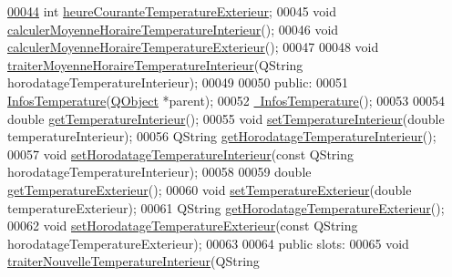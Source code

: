 \begin{DoxyCode}
\hyperlink{class_infos_temperature_a44edcf244175896e28798f252900f774}{00044}     \textcolor{keywordtype}{int} \hyperlink{class_infos_temperature_a44edcf244175896e28798f252900f774}{heureCouranteTemperatureExterieur};
00045     \textcolor{keywordtype}{void} \hyperlink{class_infos_temperature_a8cb8b9bef07506019ea6c9d91809af87}{calculerMoyenneHoraireTemperatureInterieur}();
00046     \textcolor{keywordtype}{void} \hyperlink{class_infos_temperature_a437325028225d765780b884614c47077}{calculerMoyenneHoraireTemperatureExterieur}();
00047 
00048     \textcolor{keywordtype}{void} \hyperlink{class_infos_temperature_a0311c8ce5730388f3baef752920d5abf}{traiterMoyenneHoraireTemperatureInterieur}(QString 
      horodatageTemperatureInterieur);
00049 
00050 \textcolor{keyword}{public}:
00051     \hyperlink{class_infos_temperature_ac628607fe2ff9ca9e2d6bad741ae231a}{InfosTemperature}(\hyperlink{class_q_object}{QObject} *parent);
00052     \hyperlink{class_infos_temperature_a86503a69e48f1919edbb02a434d2b124}{~InfosTemperature}();
00053 
00054     \textcolor{keywordtype}{double} \hyperlink{class_infos_temperature_aaf4cb4fd8a7c46d14955d3175498f91c}{getTemperatureInterieur}();
00055     \textcolor{keywordtype}{void} \hyperlink{class_infos_temperature_ac11ec6b1860f43dc989a02a7967497e7}{setTemperatureInterieur}(\textcolor{keywordtype}{double} temperatureInterieur);
00056     QString \hyperlink{class_infos_temperature_aca40f109786cf22d78402f8b7f3fe408}{getHorodatageTemperatureInterieur}();
00057     \textcolor{keywordtype}{void} \hyperlink{class_infos_temperature_a4d846391dfd204515e68c3f005b7be3c}{setHorodatageTemperatureInterieur}(\textcolor{keyword}{const} QString 
      horodatageTemperatureInterieur);
00058 
00059     \textcolor{keywordtype}{double} \hyperlink{class_infos_temperature_aebb00308151b8b6319732b62bd7b4b55}{getTemperatureExterieur}();
00060     \textcolor{keywordtype}{void} \hyperlink{class_infos_temperature_a40f22fbc27ed768e8269cdbf3df708c6}{setTemperatureExterieur}(\textcolor{keywordtype}{double} temperatureExterieur);
00061     QString \hyperlink{class_infos_temperature_a76b07dc0790718e134e306fe760e6cbf}{getHorodatageTemperatureExterieur}();
00062     \textcolor{keywordtype}{void} \hyperlink{class_infos_temperature_a85118414b65a715d07a92df3059c6fea}{setHorodatageTemperatureExterieur}(\textcolor{keyword}{const} QString 
      horodatageTemperatureExterieur);
00063 
00064   \textcolor{keyword}{public} slots:
00065     \textcolor{keywordtype}{void} \hyperlink{class_infos_temperature_a547da18a7c04603d2f30eece061d9634}{traiterNouvelleTemperatureInterieur}(QString 

\end{DoxyCode}
